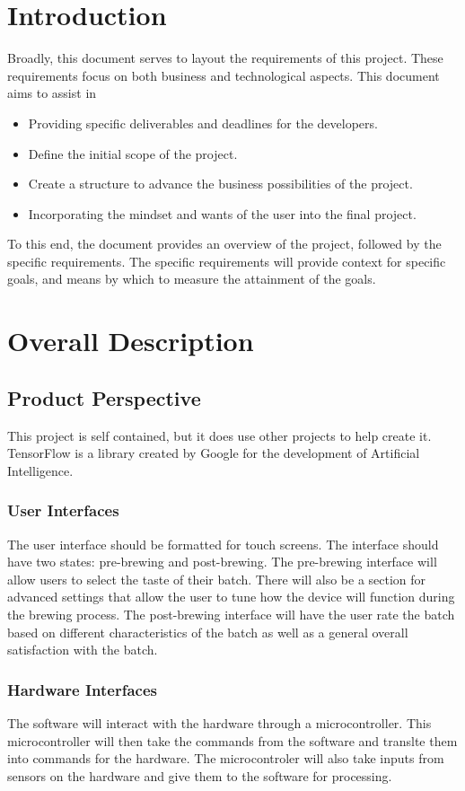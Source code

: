 \documentclass[draftclsnofoot,onecolumn,letterpaper,10pt]{IEEEtran}
\begin{document}
\section{Introduction}
Broadly, this document serves to layout the requirements of this project.
These requirements focus on both business and technological aspects.
This document aims to assist in
\begin{itemize}
	\item Providing specific deliverables and deadlines for the developers.
	\item Define the initial scope of the project.
	\item Create a structure to advance the business possibilities of the project.
	\item Incorporating the mindset and wants of the user into the final project.
\end{itemize}
To this end, the document provides an overview of the project, followed by the specific requirements.
The specific requirements will provide context for specific goals, and means by which to measure the attainment of the goals.

\section{Overall Description}
\subsection{Product Perspective}
This project is self contained, but it does use other projects to help create it.
TensorFlow is a library created by Google for the development of Artificial Intelligence.

\subsubsection{User Interfaces}
The user interface should be formatted for touch screens.
The interface should have two states: pre-brewing and post-brewing.
The pre-brewing interface will allow users to select the taste of their batch.
There will also be a section for advanced settings that allow the user to tune how the device will function during the brewing process.
The post-brewing interface will have the user rate the batch based on different characteristics of the batch as well as a general overall satisfaction with the batch.

\subsubsection{Hardware Interfaces}
The software will interact with the hardware through a microcontroller.
This microcontroller will then take the commands from the software and translte them into commands for the hardware.
The microcontroler will also take inputs from sensors on the hardware and give them to the software for processing.
\end{document}
